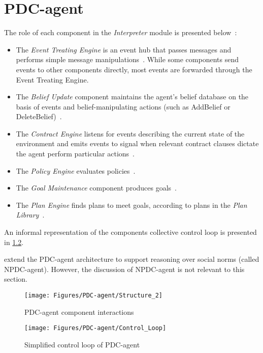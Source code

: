 \chapter{PDC-agent}
\label{appendix:pdc_agent}

\begin{definition}
    The role of each component in the \textit{Interpreter} module is presented below~\citep{liao_extended_2006}:

    \begin{itemize}
        \item The \textit{Event Treating Engine} is an event hub that passes messages and performs simple message manipulations~\citep{liao_extended_2006}.
            While some components send events to other components directly, most events are forwarded through the Event Treating Engine.
        \item The \textit{Belief Update} component maintains the agent's belief database on the basis of events and belief-manipulating actions (such as AddBelief or DeleteBelief)~\citep{liao_extended_2006}.
        \item The \textit{Contract Engine} listens for events describing the current state of the environment and emits events to signal when relevant contract clauses dictate the agent perform particular actions~\citep{liao_extended_2006}.
        \item The \textit{Policy Engine} evaluates policies~\citep{liao_extended_2006}.
        \item The \textit{Goal Maintenance} component produces goals~\citep{liao_extended_2006}.
        \item The \textit{Plan Engine} finds plans to meet goals, according to plans in the \textit{Plan Library}~\citep{liao_extended_2006}.
    \end{itemize}
\end{definition}

An informal representation of the components collective control loop is presented in \cref{fig:pdc_agent_control_loop}\footnotemark.


\citet{peng_extended_2008} extend the PDC-agent architecture to support reasoning over social norms (called NPDC-agent).
However, the discussion of NPDC-agent is not relevant to this section.

\begin{figure}[h]
    \texttt{[image: Figures/PDC-agent/Structure\_2]}
    \centering
    \caption{PDC-agent component interactions}
    \label{fig:pdc_agent_structure}
\end{figure}

\begin{landscape}
    \begin{figure}[h]
        \texttt{[image: Figures/PDC-agent/Control\_Loop]}
        \centering
        \caption{Simplified control loop of PDC-agent}
        \label{fig:pdc_agent_control_loop}
    \end{figure}
\end{landscape}
